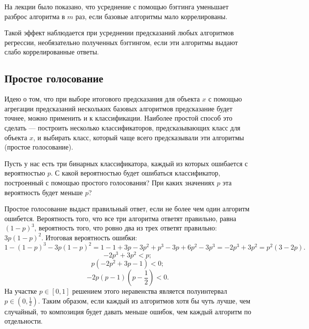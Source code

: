 \documentclass[12pt,fleqn]{article}
\begin{document}
    На лекции было показано, что усреднение с помощью бэггинга уменьшает разброс алгоритма в $m$ раз, если базовые алгоритмы мало коррелированы. 
    
    Такой эффект наблюдается при усреднении предсказаний любых алгоритмов регрессии, необязательно полученных бэггингом, если эти алгоритмы выдают слабо коррелированные ответы.
    
    \subsection{Простое голосование}
    Идею о том, что при выборе итогового предсказания для объекта $x$ с помощью агрегации предсказаний нескольких базовых алгоритмов  предсказание будет точнее, можно применить и к классификации. Наиболее простой способ это сделать --- построить несколько классификаторов, предсказывающих класс для объекта $x$, и выбирать класс, который чаще всего предсказывали эти алгоритмы (простое голосование).
    \begin{vkProblem}
    	Пусть у нас есть три бинарных классификатора, каждый из которых ошибается с вероятностью $p$. С какой вероятностью будет ошибаться классификатор, построенный с помощью простого голосования? При каких значениях $p$ эта вероятность будет меньше $p$?
    \end{vkProblem}    
    \begin{esSolution}
    	Простое голосование выдаст правильный ответ, если не более чем один алгоритм ошибется. Вероятность того, что все три алгоритма ответят правильно, равна $(1-p)^3$, вероятность того, что ровно два из трех ответят правильно: $3p(1-p)^2$. Итоговая вероятность ошибки:
    	\[
    	1 - (1-p)^3 - 3p(1-p)^2 = 
    	1 - 1 + 3p - 3p^2 + p^3 - 3p + 6 p^2 - 3 p^3 = 
    	 - 2 p^3+ 3  p^2 = p^2 (3 - 2p).
    	\]
    	\[
    	 - 2 p^3+ 3  p^2 < p;
    	\]
    	\[
    	p(- 2 p^2+ 3 p - 1) < 0;
    	\]
    	\[
    	-2 p (p-1) (p - \frac 1 2) < 0.
    	\]
    	На участке $p \in [0, 1]$ решением этого неравенства является полуинтервал $p \in (0, \frac 1 2)$. Таким образом, если каждый из алгоритмов хотя бы чуть лучше, чем случайный, то композиция будет давать меньше ошибок, чем каждый алгоритм по отдельности.
    \end{esSolution}

    
\end{document}
